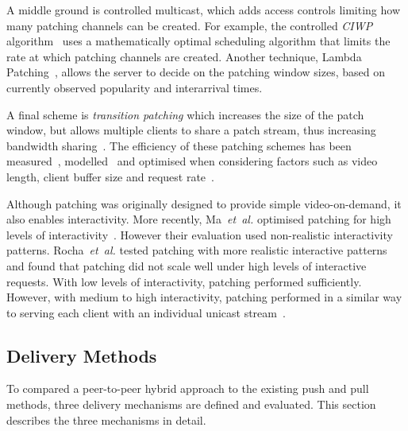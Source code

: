     A middle ground is controlled multicast, which adds access controls limiting how many patching channels can be created. For example, the controlled \emph{CIWP} algorithm~\cite{gao1999siv} uses a mathematically optimal scheduling algorithm that limits the rate at which patching channels are created. Another technique, Lambda Patching~\cite{griwodz2000tlp}, allows the server to decide on the patching window sizes, based on currently observed popularity and interarrival times.

    A final scheme is \emph{transition patching} which increases the size of the patch window, but allows multiple clients to share a patch stream, thus increasing bandwidth sharing~\cite{cai1999ebs}. The efficiency of these patching schemes has been measured~\cite{bradshaw2001pba, eager2001mbr}, modelled~\cite{tan2002qos} and optimised when considering factors such as video length, client buffer size and request rate~\cite{cai1999opp, eager1999oae, sen1999ops}.

    Although patching was originally designed to provide simple video-on-demand, it also enables interactivity. More recently, Ma~\emph{et~al.} optimised patching for high levels of interactivity~\cite{ma2005bep}. However their evaluation used non-realistic interactivity patterns. Rocha~\emph{et~al.} tested patching with more realistic interactive patterns and found that patching did not scale well under high levels of interactive requests. With low levels of interactivity, patching performed sufficiently. However, with medium to high interactivity, patching performed in a similar way to serving each client with an individual unicast stream~\cite{rocha2005sms}.



\subsection{Delivery Methods}

To compared a peer-to-peer hybrid approach to the existing push and pull methods, three delivery mechanisms are defined and evaluated. This section describes the three mechanisms in detail.

